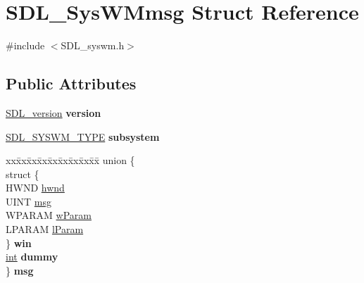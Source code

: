 \hypertarget{structSDL__SysWMmsg}{}\section{S\+D\+L\+\_\+\+Sys\+W\+Mmsg Struct Reference}
\label{structSDL__SysWMmsg}


{\ttfamily \#include $<$S\+D\+L\+\_\+syswm.\+h$>$}

\subsection*{Public Attributes}
\begin{DoxyCompactItemize}
\item 
\hypertarget{structSDL__SysWMmsg_a95f9aae58d18ee8fac556416b322a5fb}{}\hyperlink{structSDL__version}{S\+D\+L\+\_\+version} {\bfseries version}\label{structSDL__SysWMmsg_a95f9aae58d18ee8fac556416b322a5fb}

\item 
\hypertarget{structSDL__SysWMmsg_a7c3900af5ea797f1318fc77ee0ecd11b}{}\hyperlink{SDL__syswm_8h_a064c26598287280fff2a00d6758ac4f7}{S\+D\+L\+\_\+\+S\+Y\+S\+W\+M\+\_\+\+T\+Y\+P\+E} {\bfseries subsystem}\label{structSDL__SysWMmsg_a7c3900af5ea797f1318fc77ee0ecd11b}

\item 
\hypertarget{structSDL__SysWMmsg_a8890abd547a386afa3a822f15568c162}{}\begin{tabbing}
xx\=xx\=xx\=xx\=xx\=xx\=xx\=xx\=xx\=\kill
union \{\\
\>struct \{\\
\>\>HWND \hyperlink{structSDL__SysWMmsg_a55cf9583b5eddfe60a5c9851f9cce457}{hwnd}\\
\>\>UINT \hyperlink{structSDL__SysWMmsg_a74894ed060d5508ab06aac584154d61e}{msg}\\
\>\>WPARAM \hyperlink{structSDL__SysWMmsg_a7463730478d90ebc031d83098f3f74fc}{wParam}\\
\>\>LPARAM \hyperlink{structSDL__SysWMmsg_a24c1e4c3cb8d9781d34e5d99df66ac36}{lParam}\\
\>\} {\bfseries win}\\
\>\hyperlink{SDL__thread_8h_a6a64f9be4433e4de6e2f2f548cf3c08e}{int} {\bfseries dummy}\\
\} {\bfseries msg}\label{structSDL__SysWMmsg_a8890abd547a386afa3a822f15568c162}
\\

\end{tabbing}\end{DoxyCompactItemize}


